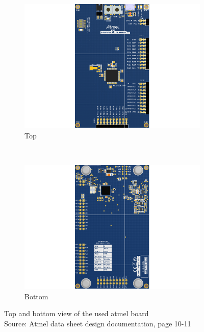 \documentclass[a4paper,12pt]{scrreprt}
\begin{document}
  \begin{figure} [H]
        \centering
        \begin{subfigure}[b]{0.45\textwidth}
                \centering
                \includegraphics[width=1\textwidth]{pictures/atmel_top.pdf}
                \caption{Top}\label{fig:atmel top}
        \end{subfigure}%
        ~ %
        \begin{subfigure}[b]{0.45\textwidth}
                \centering
                \includegraphics[width=1\textwidth]{pictures/atmel_bottom.pdf}
                \caption{Bottom}\label{fig:atmel bottom}
        \end{subfigure}
        \caption[Top and bottom view of the used atmel board]{Top and bottom view of the used atmel board\\
        Source: Atmel data sheet design documentation, page 10-11}\label{fig:atmel top and bottom}
  \end{figure}
\end{document}
